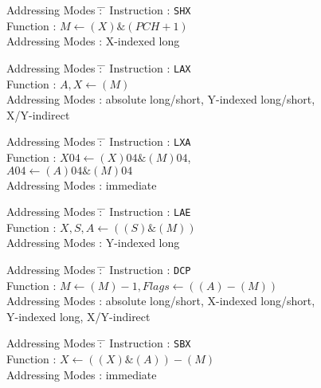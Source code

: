 \documentclass[12pt,twoside]{report}
\newcommand{\tty}[1]{{\tt #1}}
\begin{document}
\begin{tabbing}
Addressing Modes \= : \= \kill
Instruction      \> : \> \tty{SHX} \\
Function         \> : \> $M\leftarrow(X)\&(PCH+1)$ \\
Addressing Modes \> : \> X-indexed long \\
\end{tabbing}

\begin{tabbing}
Addressing Modes \= : \= \kill
Instruction      \> : \> \tty{LAX} \\
Function         \> : \> $A,X\leftarrow(M)$ \\
Addressing Modes \> : \> absolute long/short, Y-indexed long/short, \\
                 \>   \> X/Y-indirect \\
\end{tabbing}

\begin{tabbing}
Addressing Modes \= : \= \kill
Instruction      \> : \> \tty{LXA} \\
Function         \> : \> $X{04}\leftarrow(X){04}\&(M){04}$, \\
                 \>   \> $A{04}\leftarrow(A){04}\&(M){04}$ \\
Addressing Modes \> : \> immediate \\
\end{tabbing}

\begin{tabbing}
Addressing Modes \= : \= \kill
Instruction      \> : \> \tty{LAE} \\
Function         \> : \> $X,S,A\leftarrow((S)\&(M))$ \\
Addressing Modes \> : \> Y-indexed long \\
\end{tabbing}

\begin{tabbing}
Addressing Modes \= : \= \kill
Instruction      \> : \> \tty{DCP} \\
Function         \> : \> $M\leftarrow(M)-1, Flags\leftarrow((A)-(M))$ \\
Addressing Modes \> : \> absolute long/short, X-indexed long/short, \\
                 \>   \> Y-indexed long, X/Y-indirect \\
\end{tabbing}

\begin{tabbing}
Addressing Modes \= : \= \kill
Instruction      \> : \> \tty{SBX} \\
Function         \> : \> $X\leftarrow((X)\&(A))-(M)$ \\
Addressing Modes \> : \> immediate \\
\end{tabbing}
\end{document}
